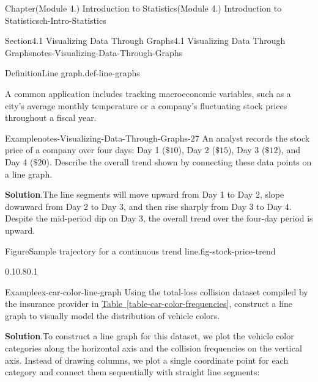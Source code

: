 \documentclass[oneside,10pt,]{book}
\newcommand{\blocktitlefont}{\relax}
\newcommand{\xreffont}{\relax}
\begin{document}
\begin{chapterptx}{Chapter}{(Module 4.) Introduction to Statistics}{}{(Module 4.) Introduction to Statistics}{}{}{ch-Intro-Statistics}
\begin{sectionptx}{Section}{4.1 Visualizing Data Through Graphs}{}{4.1 Visualizing Data Through Graphs}{}{}{notes-Visualizing-Data-Through-Graphs}
\begin{definition}{Definition}{Line graph.}{def-line-graphs}
\end{definition}
A common application includes tracking macroeconomic variables, such as a city's average monthly temperature or a company's fluctuating stock prices throughout a fiscal year.%
\begin{example}{Example}{}{notes-Visualizing-Data-Through-Graphs-27}%
An analyst records the stock price of a company over four days: Day 1 (\(\$10\)), Day 2 (\(\$15\)), Day 3 (\(\$12\)), and Day 4 (\(\$20\)). Describe the overall trend shown by connecting these data points on a line graph.%
\par\smallskip%
\noindent\textbf{\blocktitlefont Solution}.\hypertarget{notes-Visualizing-Data-Through-Graphs-27-2}{}\quad{}The line segments will move upward from Day 1 to Day 2, slope downward from Day 2 to Day 3, and then rise sharply from Day 3 to Day 4. Despite the mid-period dip on Day 3, the overall trend over the four-day period is upward.%
\begin{figureptx}{Figure}{Sample trajectory for a continuous trend line.}{fig-stock-price-trend}{}%
\begin{image}{0.1}{0.8}{0.1}{}%
%
\end{image}%
\tcblower
\end{figureptx}%
\end{example}
\begin{example}{Example}{}{ex-car-color-line-graph}%
Using the total-loss collision dataset compiled by the insurance provider in \hyperref[table-car-color-frequencies]{Table~{\xreffont\ref{table-car-color-frequencies}}}, construct a line graph to visually model the distribution of vehicle colors.%
\par\smallskip%
\noindent\textbf{\blocktitlefont Solution}.\hypertarget{ex-car-color-line-graph-2}{}\quad{}To construct a line graph for this dataset, we plot the vehicle color categories along the horizontal axis and the collision frequencies on the vertical axis. Instead of drawing columns, we plot a single coordinate point for each category and connect them sequentially with straight line segments:%

\end{example}
\end{sectionptx}
\end{chapterptx}
\end{document}
